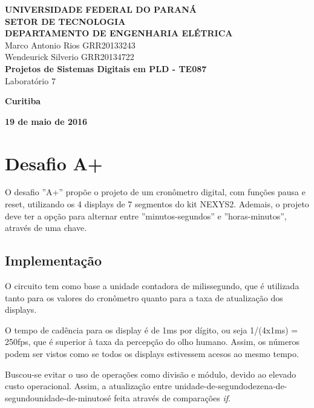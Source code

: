 \documentclass[12pt]{article}
\begin{document}
    
\begin{titlepage}
 \vfill
  \begin{center}
   {\large \textbf{UNIVERSIDADE FEDERAL DO PARANÁ \\ SETOR DE TECNOLOGIA \\ DEPARTAMENTO DE ENGENHARIA ELÉTRICA}} \\[5cm]

  {\large {Marco Antonio Rios  GRR20133243 \\ Wendeurick Silverio GRR20134722} }\\[4cm]


   {\Large \textbf{Projetos de Sistemas Digitais em PLD - TE087} \\ Laboratório 7}\\[6cm]
    \vfill

    \vspace{2cm}

    \large \textbf{Curitiba}

    \large \textbf{19 de maio de 2016}

      \end{center}
\end{titlepage}

\clearpage

\section{Desafio A+}
O desafio ''A+'' propõe o projeto de um cronômetro digital, com funções pausa e reset, utilizando os 4 displays de 7 segmentos do kit NEXYS2. Ademais, o projeto deve ter a opção para alternar entre ''minutos-segundos'' e ''horas-minutos'', através de uma chave.

\subsection{Implementação}
O circuito tem como base a unidade contadora de milissegundo, que é utilizada tanto para os valores do cronômetro quanto para a taxa de atualização dos displays.

O tempo de cadência para os display é de 1ms por dígito, ou seja 1/(4x1ms) = 250fps, que é superior à taxa da percepção do olho humano. Assim, os números podem ser vistos como se todos os displays estivessem acesos ao mesmo tempo.

Buscou-se evitar o uso de operações como divisão e módulo, devido ao elevado custo operacional. Assim, a atualização entre unidade-de-segundo\textrightarrow dezena-de-segundo\textrightarrow unidade-de-minutos\textrightarrow [...] é feita através de comparações \emph{if}.
\end{document}
